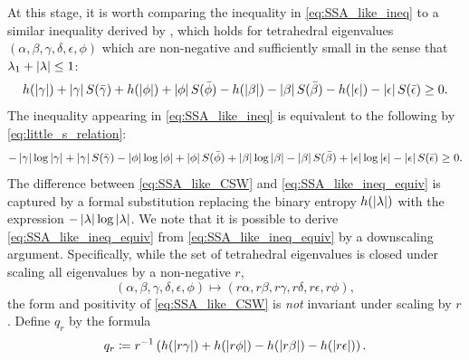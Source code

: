 \documentclass[notitlepage, 10pt]{article}
\begin{document}
\begin{rem}
    At this stage, it is worth comparing the inequality in \cref{eq:SSA_like_ineq} to a similar inequality derived by \citeauthor{christandl2018recoupling} \cite{christandl2018recoupling}, which holds for tetrahedral eigenvalues $(\alpha,\beta,\gamma,\delta,\epsilon,\phi)$ which are non-negative and sufficiently small in the sense that $\lambda_1 + \left|\lambda\right| \leq 1$:
    \begin{equation}
        \label{eq:SSA_like_CSW}
        h(\left|\gamma\right|) 
        + \left|\gamma\right| S(\bar \gamma)
        +h(\left|\phi\right|) 
        + \left|\phi\right| S(\bar \phi)  
        -h(\left|\beta\right|) 
        - \left|\beta\right| S(\bar \beta)  
        -h(\left|\epsilon\right|) 
        - \left|\epsilon\right| S(\bar \epsilon)  
        \geq 0.
    \end{equation}
    The inequality appearing in \cref{eq:SSA_like_ineq} is equivalent to the following by \cref{eq:little_s_relation}:
    \begin{equation}
        \label{eq:SSA_like_ineq_equiv}
        -\left|\gamma\right|\log\left|\gamma\right|
        + \left|\gamma\right| S(\bar \gamma)
        -\left|\phi\right|\log\left|\phi\right|
        + \left|\phi\right| S(\bar \phi)  
        +\left|\beta\right|\log\left|\beta\right|
        - \left|\beta\right| S(\bar \beta)  
        +\left|\epsilon\right|\log\left|\epsilon\right|
        - \left|\epsilon\right| S(\bar \epsilon)  
        \geq 0.
    \end{equation}
    The difference between \cref{eq:SSA_like_CSW} and \cref{eq:SSA_like_ineq_equiv} is captured by a formal substitution replacing the binary entropy $h(\left|\lambda\right|)$ with the expression $-\left|\lambda\right|\log \left|\lambda\right|$.
    We note that it is possible to derive \cref{eq:SSA_like_ineq_equiv} from \cref{eq:SSA_like_ineq_equiv} by a downscaling argument.
    Specifically, while the set of tetrahedral eigenvalues is closed under scaling all eigenvalues by a non-negative $r$,
    \begin{equation}
        \label{eq:tetrahedral_scaling}
        (\alpha,\beta,\gamma,\delta,\epsilon,\phi) \mapsto (r\alpha,r\beta,r\gamma,r\delta,r\epsilon,r\phi),
    \end{equation}
    the form and positivity of \cref{eq:SSA_like_CSW} is \textit{not} invariant under scaling by $r$.
    Define $q_{r}$ by the formula
    \begin{equation}
        q_{r} \coloneqq r^{-1}\left(
            h(\left|r\gamma\right|) 
            +h(\left|r\phi\right|) 
            -h(\left|r\beta\right|) 
            -h(\left|r\epsilon\right|) 
        \right).
    \end{equation}

\end{rem}
\end{document}
